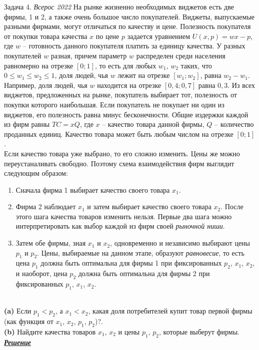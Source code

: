 \begin{mybox}{Задача 4. \textit{Всерос 2022}}
    \indent\setlength{\parindent}{1em}\indent\setlength{\parindent}{1em}На рынке жизненно необходимых виджетов есть две
    фирмы, 1 и 2, а также очень большое число покупателей. Виджеты, выпускаемые разными фирмами, могут отличаться по
    качеству и цене. Полезность покупателя от покупки товара качества $x$ по цене $p$ задается уравнением
    $U(x,p)=wx-p$, где $w$ – готовность данного покупателя платить за единицу качества. У разных покупателей $w$
    разная, причем параметр $w$ распределен среди населения равномерно на отрезке $[0; 1]$, то есть для любых $w_1$,
    $w_2$ таких, что $0\leq w_1 \leq w_2 \leq 1$, доля людей, чья $w$ лежит на отрезке $[w_1;w_2]$, равна $w_2 - w_1$.
    Например, доля людей, чья $w$ находится на отрезке $[0,4; 0,7]$ равна $0,3$. Из всех виджетов, предложенных на
    рынке, покупатель выбирает тот, полезность от покупки которого наибольшая. Если покупатель не покупает ни один из
    виджетов, его полезность равна минус бесконечности. Общие издержки каждой из фирм равны $TC=xQ$, где $x$ – качество
    товара данной фирмы, $Q$ – количество проданных единиц. Качество товара может быть любым числом на отрезке $[0; 1]$.\\
    \indent\setlength{\parindent}{1em}Если качество товара уже выбрано, то его сложно
    изменить. Цены же можно переустаналивать свободно. Поэтому схема взаимодействия фирм выглядит следующим образом:
    \begin{enumerate}
        \item Сначала фирма 1 выбирает качество своего товара $x_1$.
        \item Фирма 2 наблюдает $x_1$ и затем выбирает качество своего товара $x_2$. После этого шага качества товаров
        изменить нельзя. Первые два шага можно интерпретировать как выбор каждой из фирм своей \textit{рыночной ниши}.
        \item Затем обе фирмы, зная $x_1$ и $x_2$, одновременно и независимо выбирают цены $p_1$ и $p_2$. Цены,
        выбираемые на данном этапе, образуют \textit{равновесие}, то есть цена $p_1$ должна быть оптимальна для фирмы 1 при
        фиксированных $p_2$, $x_1$, $x_2$, и наоборот, цена $p_2$ должна быть оптимальна для фирмы 2 при фиксированных
        $p_1$, $x_1$, $x_2$.
    \end{enumerate}\smallskip\\
    \indent\setlength{\parindent}{1em}\indent\setlength{\parindent}{1em}\textbf{(a)} Если $p_1<p_2$, а $x_1<x_2$, какая доля потребителей купит товар
    первой фирмы (как функция от $x_1$, $x_2$, $p_1$, $p_2$)?.\smallskip\\
    \indent\setlength{\parindent}{1em}\textbf{(b)} Найдите качества товаров $x_1$, $x_2$ и цены $p_1$, $p_2$, которые
    выберут фирмы.\bigskip\\
    \textit{\textbf{\centering\href{https://iloveeconomics.ru/sites/default/files/olimp/vseros/2022/vseros_2022_solutions_10_23379.pdf}{Решение}}}
\end{mybox}

